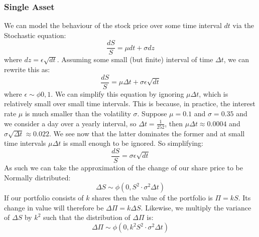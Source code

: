 \documentclass[../analytical_approach.tex]{subfiles}
\begin{document}
\subsubsection{Single Asset}

We can model the behaviour of the stock price over some time interval $dt$ via the Stochastic equation:
\begin{equation}
    \label{eqn:stochastic}
    \frac{dS}{S}=\mu dt + \sigma dz
\end{equation}
where $dz = \epsilon\sqrt{dt}$. Assuming some small (but finite) interval of time $\Delta t$, we can rewrite this as:
\begin{equation}
    \label{eqn:stochastic2}
    \frac{dS}{S}=\mu \Delta t + \sigma \epsilon\sqrt{dt}
\end{equation}
where $\epsilon\sim\phi{0,1}$.
We can simplify this equation by ignoring $\mu \Delta t$, which is relatively small over small time intervals.
This is because, in practice, the interest rate $\mu$ is much smaller than the volatility $\sigma$.
Suppose $\mu = 0.1$ and $\sigma = 0.35$ and we consider a day over a yearly interval, so $\Delta t = \frac{1}{252}$, then $\mu \Delta t \approx 0.0004$ and $\sigma \sqrt{\Delta t} \approx 0.022$.
We see now that the latter dominates the former and at small time intervals $\mu \Delta t$ is small enough to be ignored.
So simplifying:
\begin{equation}
    \label{eqn:stochastic3}
    \frac{dS}{S}=\sigma \epsilon\sqrt{dt}
\end{equation}
As such we can take the approximation of the change of our share price to be Normally distributed:
\begin{equation}
    \label{eqn:distributionS}
    \Delta S\sim\phi(0,S^2\cdot\sigma^2\Delta t)
\end{equation}
If our portfolio consists of $k$ shares then the value of the portfolio is $\Pi=kS$.
Its change in value will therefore be $\Delta \Pi = k \Delta S$.
Likewise, we multiply the variance of $\Delta S$ by $k^2$ such that the distribution of $\Delta\Pi$ is:
\begin{equation}
    \label{eqn:distributionPi}
    \Delta \Pi\sim\phi(0,k^2S^2\cdot\sigma^2\Delta t)
\end{equation}
\end{document}
